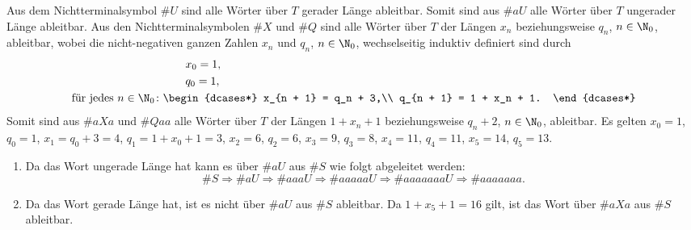 \documentclass[12pt]{article}
\begin{document}
\begin{loesung}
  Aus dem Nichtterminalsymbol $\#U$ sind alle Wörter über $T$ gerader Länge ableitbar. Somit sind aus $\#{aU}$ alle Wörter über $T$ ungerader Länge ableitbar. Aus den Nichtterminalsymbolen $\#X$ und $\#Q$ sind alle Wörter über $T$ der Längen $x_n$ beziehungsweise $q_n$, $n \in \N_0$, ableitbar, wobei die nicht-negativen ganzen Zahlen $x_n$ und $q_n$, $n \in \N_0$, wechselseitig induktiv definiert sind durch
  \begin{align*}
    &\qquad x_0 = 1,\\
    &\qquad q_0 = 1,\\
    \text{für jedes } n \in \N_0 \colon &\begin{dcases*}
                                          x_{n + 1} = q_n + 3,\\
                                          q_{n + 1} = 1 + x_n + 1.
                                        \end{dcases*}
  \end{align*}
  Somit sind aus $\#{aXa}$ und $\#{Qaa}$ alle Wörter über $T$ der Längen $1 + x_n + 1$ beziehungsweise $q_n + 2$, $n \in \N_0$, ableitbar. Es gelten $x_0 = 1$, $q_0 = 1$, $x_1 = q_0 + 3 = 4$, $q_1 = 1 + x_0 + 1 = 3$, $x_2 = 6$, $q_2 = 6$, $x_3 = 9$, $q_3 = 8$, $x_4 = 11$, $q_4 = 11$, $x_5 = 14$, $q_5 = 13$.
  \begin{enumerate}
    \item Da das Wort ungerade Länge hat kann es über $\#{aU}$ aus $\#S$ wie folgt abgeleitet werden:
          \begin{equation*}
            \#S \Rightarrow \#{aU}
                \Rightarrow \#{aaaU}
                \Rightarrow \#{aaaaaU}
                \Rightarrow \#{aaaaaaaU}
                \Rightarrow \#{aaaaaaa}.
          \end{equation*}
    \item Da das Wort gerade Länge hat, ist es nicht über $\#{aU}$ aus $\#S$ ableitbar. Da $1 + x_5 + 1 = 16$ gilt, ist das Wort über $\#{aXa}$ aus $\#S$ ableitbar.


\end{enumerate}
\end{loesung}
\end{document}
